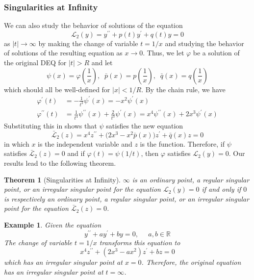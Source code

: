 \documentclass{article}
\newtheorem{theorem}{Theorem}[section]
\newtheorem{example}{Example}[section]
\theoremstyle{remark}
\theoremstyle{definition}
\begin{document}
    \subsubsection{Singularities at Infinity}

      We can also study the behavior of solutions of the equation
      \[\mathcal{L}_2 (y) = y^{\prime\prime} + p(t) y^\prime + q(t) y = 0\]
      as $|t| \rightarrow \infty$ by making the change of variable $t = 1/x$ and studying the behavior of solutions of the resulting equation as $x \rightarrow 0$. Thus, we let $\varphi$ be a solution of the original DEQ for $|t|>R$ and let
      \[\psi(x) = \varphi(\frac{1}{x}), \;\; \bar{p}(x) = p(\frac{1}{x}), \;\; \bar{q}(x) = q(\frac{1}{x})\]
      which should all be well-defined for $|x|<1/R$. By the chain rule, we have
      \begin{align*}
          \varphi^\prime (t) & = -\frac{1}{t^2} \psi^\prime (x) = -x^2 \psi^\prime (x) \\
          \varphi^{\prime\prime} (t) & = \frac{1}{t^4} \psi^{\prime\prime} (x) + \frac{2}{t^3} \psi^\prime (x) = x^4 \psi^{\prime\prime}(x) + 2x^3 \psi^\prime (x) 
      \end{align*}
      Substituting this in shows that $\psi$ satisfies the new equation
      \[\bar{\mathcal{L}}_2 (z) = x^4 z^{\prime\prime} + \big( 2x^3 - x^2 \bar{p}(x)\big) z^\prime + \bar{q} (x) z= 0\]
      in which $x$ is the independent variable and $z$ is the function. Therefore, if $\psi$ satisfies $\bar{\mathcal{L}}_2 (z) = 0$ and if $\varphi(t) = \psi(1/t)$, then $\varphi$ satisfies $\mathcal{L}_2 (y) = 0$. Our results lead to the following theorem. 

      \begin{theorem}[Singularities at Infinity]
      $\infty$ is an ordinary point, a regular singular point, or an irregular singular point for the equation $\mathcal{L}_2 (y) = 0$ if and only if $0$ is respectively an ordinary point, a regular singular point, or an irregular singular point for the equation $\bar{\mathcal{L}}_2 (z) = 0$. 
      \end{theorem}

      \begin{example}
      Given the equation
      \[y^{\prime\prime} + a y^\prime + by = 0, \;\;\;\;\; a, b \in \mathbb{R}\]
      The change of variable $t = 1/x$ transforms this equation to
      \[x^4 z^{\prime\prime} + (2x^3 - ax^2) z^\prime + bz = 0\]
      which has an irregular singular point at $x = 0$. Therefore, the original equation has an irregular singular point at $t = \infty$. 
      \end{example}
\end{document}
